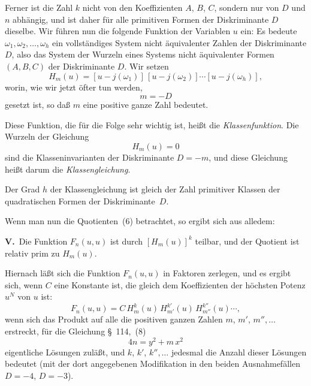 \documentclass[12pt,a4paper]{article}
\theoremstyle{weber}
\begin{document}
Ferner ist die Zahl $k$ nicht von den Koeffizienten $A$, $B$, $C$, sondern nur von $D$ und $n$ abhängig, und ist daher für alle primitiven Formen der Diskriminante $D$ dieselbe. Wir führen nun die folgende Funktion der Variablen $u$ ein: Es bedeute $\omega_1, \omega_2, \ldots, \omega_h$ ein vollständiges System nicht äquivalenter Zahlen der Diskriminante $D$, also das System der Wurzeln eines Systems nicht äquivalenter Formen $(A, B, C)$ der Diskriminante $D$. Wir setzen
\begin{equation}
H_m(u) = [u - j(\omega_1)]\,[u - j(\omega_2)] \cdots [u - j(\omega_h)],
\end{equation}
worin, wie wir jetzt öfter tun werden,
\begin{equation}
m = -D
\end{equation}
gesetzt ist, so daß $m$ eine positive ganze Zahl bedeutet.

Diese Funktion, die für die Folge sehr wichtig ist, heißt die \textit{Klassenfunktion}. Die Wurzeln der Gleichung
\begin{equation}
H_m(u) = 0
\end{equation}
sind die Klasseninvarianten der Diskriminante $D = -m$, und diese Gleichung heißt darum die \textit{Klassengleichung}.

Der Grad $h$ der Klassengleichung ist gleich der Zahl primitiver Klassen der quadratischen Formen der Diskriminante~$D$.

Wenn man nun die Quotienten~(6) betrachtet, so ergibt sich aus alledem:

\medskip
\textbf{V.}\ Die Funktion $F_n(u, u)$ ist durch $[H_m(u)]^k$ teilbar, und der Quotient ist relativ prim zu $H_m(u)$.

\medskip
Hiernach läßt sich die Funktion $F_n(u, u)$ in Faktoren zerlegen, und es ergibt sich, wenn $C$ eine Konstante ist, die gleich dem Koeffizienten der höchsten Potenz $u^N$ von $u$ ist:
\begin{equation}
F_n(u, u) = C\, H_m^k(u)\, H_{m'}^{k'}(u)\, H_{m''}^{k''}(u) \cdots,
\end{equation}
wenn sich das Produkt auf alle die positiven ganzen Zahlen $m$, $m'$, $m'', \ldots$ erstreckt, für die Gleichung \S~114,~(8)
\begin{equation}
4n = y^2 + m\,x^2
\end{equation}
eigentliche Lösungen zuläßt, und $k$, $k'$, $k'', \ldots$ jedesmal die Anzahl dieser Lösungen bedeutet (mit der dort angegebenen Modifikation in den beiden Ausnahmefällen $D = -4$, $D = -3$).
\end{document}
